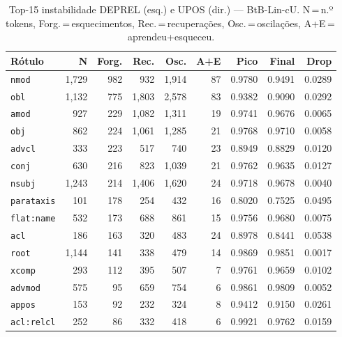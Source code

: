 

\begin{table}[ht]
\centering
\caption{Top-15 instabilidade DEPREL (esq.) e UPOS (dir.) --- BtB-Lin-cU. N\,=\,n.º tokens, Forg.\,=\,esquecimentos, Rec.\,=\,recuperações, Osc.\,=\,oscilações, A+E\,=\,aprendeu+esqueceu.}
\label{tab:inst-predictions-results-bertimbau-base-linear}
\begin{minipage}[t]{0.54\linewidth}
\centering\tiny
\begin{tabular}{lrrrrrrrr}
\toprule
\textbf{Rótulo} & \textbf{N} & \textbf{Forg.} & \textbf{Rec.} & \textbf{Osc.} & \textbf{A+E} & \textbf{Pico} & \textbf{Final} & \textbf{Drop} \\
\midrule
\texttt{nmod} & 1,729 & 982 & 932 & 1,914 & 87 & 0.9780 & 0.9491 & 0.0289 \\
\texttt{obl} & 1,132 & 775 & 1,803 & 2,578 & 83 & 0.9382 & 0.9090 & 0.0292 \\
\texttt{amod} & 927 & 229 & 1,082 & 1,311 & 19 & 0.9741 & 0.9676 & 0.0065 \\
\texttt{obj} & 862 & 224 & 1,061 & 1,285 & 21 & 0.9768 & 0.9710 & 0.0058 \\
\texttt{advcl} & 333 & 223 & 517 & 740 & 23 & 0.8949 & 0.8829 & 0.0120 \\
\texttt{conj} & 630 & 216 & 823 & 1,039 & 21 & 0.9762 & 0.9635 & 0.0127 \\
\texttt{nsubj} & 1,243 & 214 & 1,406 & 1,620 & 24 & 0.9718 & 0.9678 & 0.0040 \\
\texttt{parataxis} & 101 & 178 & 254 & 432 & 16 & 0.8020 & 0.7525 & 0.0495 \\
\texttt{flat\!:\!name} & 532 & 173 & 688 & 861 & 15 & 0.9756 & 0.9680 & 0.0075 \\
\texttt{acl} & 186 & 163 & 320 & 483 & 24 & 0.8978 & 0.8441 & 0.0538 \\
\texttt{root} & 1,144 & 141 & 338 & 479 & 14 & 0.9869 & 0.9851 & 0.0017 \\
\texttt{xcomp} & 293 & 112 & 395 & 507 & 7 & 0.9761 & 0.9659 & 0.0102 \\
\texttt{advmod} & 575 & 95 & 659 & 754 & 6 & 0.9861 & 0.9809 & 0.0052 \\
\texttt{appos} & 153 & 92 & 232 & 324 & 8 & 0.9412 & 0.9150 & 0.0261 \\
\texttt{acl\!:\!relcl} & 252 & 86 & 332 & 418 & 6 & 0.9921 & 0.9762 & 0.0159 \\
\bottomrule
\end{tabular}
\end{minipage}

\end{table}
